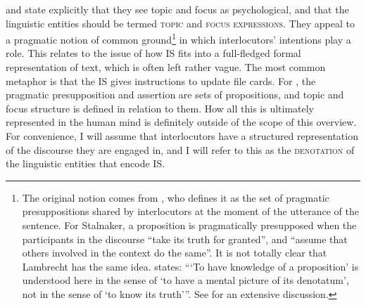 \documentclass[output=paper,hidelinks]{langscibook}
\begin{document}
\citet{Lambrecht} and \citet{Vallduvi} state explicitly that they see topic and focus as psychological, and that the linguistic entities should be termed \textsc{topic} and \textsc{focus expressions}. They appeal to a pragmatic notion of common ground\footnote{The original notion comes from \citet{Stalnaker1970}, who defines it as the set of pragmatic presuppositions shared by interlocutors at the moment of the utterance of the sentence. For Stalnaker, a proposition is pragmatically presupposed when the participants in the discourse ``take its truth for granted'', and ``assume that others involved in the context do the same''. It is not totally clear that Lambrecht has the same idea. \citet[44]{Lambrecht} states: ``\/`To have knowledge of a proposition' is understood here in the sense of `to have a mental picture of its denotatum', not in the sense of `to know its truth'\/''.  See \citealt{dryer1995} for an extensive discussion.} in which interlocutors' intentions play a role. This relates to the issue of how IS fits into a full-fledged formal representation of text, which is often left rather vague. The most common metaphor is that the IS gives instructions to update file cards. For \citet{Lambrecht}, the pragmatic presupposition and assertion are sets of propositions, and topic and focus structure is defined in relation to them. How all this is ultimately represented in the human mind is definitely outside of the scope of this overview. For convenience, I will assume that interlocutors have a structured representation of the discourse they are engaged in, and I will refer to this as the \textsc{denotation} of the linguistic entities that encode IS. 
\end{document}

